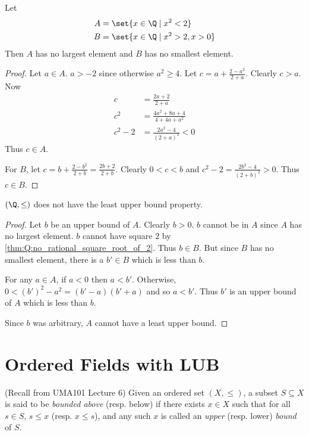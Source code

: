 \begin{theorem} \label{thm:Q:root2_approximation}
    Let \begin{align*}
        A &= \set{x \in \Q \mid x^2 < 2} \\
        B &= \set{x \in \Q \mid x^2 > 2, x > 0}
    \end{align*}
    Then $A$ has no largest element and $B$ has no smallest element.
\end{theorem}
\begin{proof}
    Let $a \in A$.
    $a > -2$ since otherwise $a^2 \ge 4$.
    Let $c = a + \frac{2 - a^2}{2 + a}$.
    Clearly $c > a$.
    Now \begin{align*}
        c      &= \frac{2a + 2}{2 + a} \\
        c^2     &= \frac{4a^2 + 8a + 4}{4 + 4a + a^2} \\
        c^2 - 2 &= \frac{2a^2 - 4}{(2 + a)^2} < 0
    \end{align*}
    Thus $c \in A$.

    For $B$, let $c = b + \frac{2 - b^2}{2 + b} = \frac{2b + 2}{2 + b}$.
    Clearly $0 < c < b$ and $c^2 - 2 = \frac{2b^2 - 4}{(2 + b)^2} > 0$.
    Thus $c \in B$.
\end{proof}

\begin{corollary} \label{thm:Q:no_lub}
    $(\Q, \le)$ does not have the least upper bound property.
\end{corollary}
\begin{proof}
    Let $b$ be an upper bound of $A$.
    Clearly $b > 0$.
    $b$ cannot be in $A$ since $A$ has no largest element.
    $b$ cannot have square $2$ by \cref{thm:Q:no_rational_square_root_of_2}.
    Thus $b \in B$.
    But since $B$ has no smallest element, there is a $b' \in B$ which is less
    than $b$.

    For any $a \in A$, if $a < 0$ then $a < b'$.
    Otherwise, $0 < (b')^2 - a^2 = (b' - a)(b' + a)$ and so $a < b'$.
    Thus $b'$ is an upper bound of $A$ which is less than $b$.

    Since $b$ was arbitrary, $A$ cannot have a least upper bound.
\end{proof}

\section{Ordered Fields with LUB} \label{sec:ordered_fields_with_lub}
(Recall from UMA101 Lecture 6)
Given an ordered set $(X, \le)$, a subset $S \subseteq X$ is said to be
\emph{bounded above} (resp. below) if there exists $x \in X$ such that for all
$s \in S$, $s \le x$ (resp. $x \le s$), and any such $x$ is called an
\emph{upper} (resp. lower) \emph{bound} of $S$.

